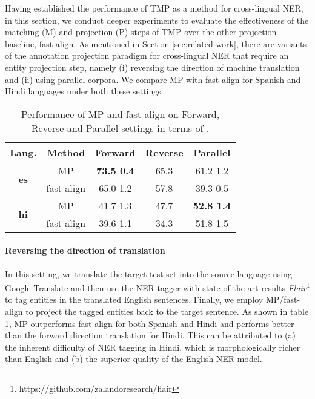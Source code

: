 \documentclass[11pt,a4paper]{article}
\begin{document}
Having established the performance of TMP 
as a method for cross-lingual NER,
in this section, we conduct deeper experiments 
to evaluate the effectiveness of the matching (M) and projection (P) steps of TMP over the other projection baseline, fast-align. 
As mentioned in Section \ref{sec:related-work}, 
there are variants of the annotation projection paradigm for cross-lingual NER 
that require an entity projection step, namely 
(i) reversing the direction of machine translation and 
(ii) using parallel corpora. 
We compare MP with fast-align for Spanish and Hindi languages under both these settings.

\begin{table}[htb]
\small
\centering
\begin{tabularx}{220pt}{ccccc}
\toprule
\bf Lang. & \bf Method & \bf Forward & \bf Reverse & \bf Parallel \\
\midrule
\multirow{2}{*}{\bf es} & MP & \bf 73.5  0.4 & 65.3 & 61.2  1.2 \\
 & fast-align & 65.0  1.2 & 57.8 & 39.3  0.5 \\
\midrule
\multirow{2}{*}{\bf hi} & MP & 41.7  1.3 & 47.7 & \bf 52.8  1.4 \\
& fast-align & 39.6  1.1 & 34.3 & 51.8  1.5 \\
\bottomrule
\end{tabularx}
\caption{Performance of MP and fast-align on Forward, Reverse and Parallel settings in terms of .}
\label{tab:analysis_paradigms}
\end{table}



\paragraph{Reversing the direction of translation} 
In this setting, we translate the target test set 
into the source language using Google Translate 
and then use the NER tagger with state-of-the-art results \textit{Flair}\footnote{https://github.com/zalandoresearch/flair} 
to tag entities in the translated English sentences.
Finally, we employ MP/fast-align to project the tagged entities back to the target sentence. 
As shown in table \ref{tab:analysis_paradigms}, 
MP outperforms fast-align for both Spanish and Hindi 
and performs better than the forward direction translation for Hindi. 
This can be attributed to 
(a) the inherent difficulty of NER tagging in Hindi,
which is morphologically richer than English and 
(b) the superior quality of the English NER model.
\end{document}
